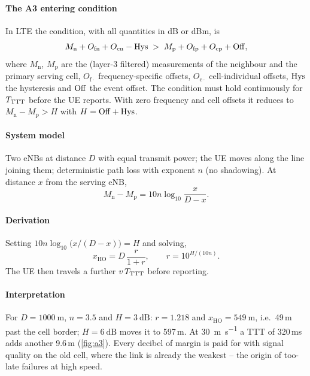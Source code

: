 \documentclass[11pt,a4paper]{article}
\begin{document}
\paragraph{The A3 entering condition} In LTE \cite{ts36331} the condition, with all quantities in
dB or dBm, is
\begin{equation}\label{eq:a3}
  M_\mathrm{n} + O_{\mathrm{fn}} + O_{\mathrm{cn}} - \mathrm{Hys} \;>\; M_\mathrm{p} + O_{\mathrm{fp}} + O_{\mathrm{cp}} + \mathrm{Off} ,
\end{equation}
where $M_\mathrm{n}$, $M_\mathrm{p}$ are the (layer-3 filtered) measurements of the neighbour and
the primary serving cell, $O_{\mathrm{f}\cdot}$ frequency-specific offsets, $O_{\mathrm{c}\cdot}$
cell-individual offsets, $\mathrm{Hys}$ the hysteresis and $\mathrm{Off}$ the event offset. The condition must
hold continuously for $T_{\mathrm{TTT}}$ before the UE reports. With zero frequency and cell offsets it reduces
to $M_\mathrm{n} - M_\mathrm{p} > H$ with $H = \mathrm{Off} + \mathrm{Hys}$.

\paragraph{System model} Two eNBs at distance $D$ with equal transmit power; the UE moves along the
line joining them; deterministic path loss with exponent $n$ (no shadowing). At distance $x$ from
the serving eNB,
\begin{equation}
  M_\mathrm{n} - M_\mathrm{p} = 10n\log_{10}\frac{x}{D-x}.
\end{equation}
\paragraph{Derivation} Setting $10n\log_{10}\bigl(x/(D-x)\bigr) = H$ and solving,
\begin{equation}\label{eq:hopoint}
  x_{\mathrm{HO}} = D\,\frac{r}{1+r}, \qquad r = 10^{H/(10n)} .
\end{equation}
The UE then travels a further $v\,T_{\mathrm{TTT}}$ before reporting.
\paragraph{Interpretation} For $D = \qty{1000}{\metre}$, $n=3.5$ and $H = \qty{3}{\dB}$: $r=1.218$
and $x_{\mathrm{HO}} = \qty{549}{\metre}$, i.e.\ 49\,m past the cell border; $H = \qty{6}{\dB}$ moves
it to 597\,m. At \qty{30}{\metre\per\second} a TTT of 320\,ms adds another 9.6\,m
(\cref{fig:a3}). Every decibel of margin is paid for with signal quality on the old cell, where
the link is already the weakest -- the origin of too-late failures at high speed.
\end{document}
